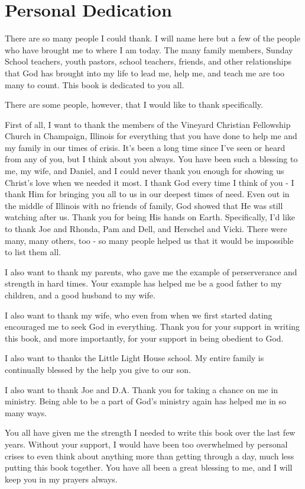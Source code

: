 \chapter{Personal Dedication}
\label{dedicationap}

There are so many people I could thank.  I will name here but a few
of the people who have brought me to where I am today.  The many family
members, Sunday School teachers, youth pastors, school teachers, friends,
and other relationships that God has brought into my life to lead me, help
me, and teach me are too many to count.  This book is dedicated to you all.

There are some people, however, that I would like to thank specifically.

First of all, I want to thank the members of the Vineyard Christian Fellowship 
Church in Champaign, Illinois for everything that you have done to help me and my 
family in our times of crisis.  It's been a long time since I've seen or 
heard from any of you, but I think about you always.  You have been
such a blessing to me, my wife, and Daniel, and I could never thank you
enough for showing us Christ's love when we needed it most.  I thank God
every time I think of you - I thank Him for bringing you all to us in
our deepest times of need.  Even out in the middle of Illinois with no
friends of family, God showed that He was still watching after us.  Thank
you for being His hands on Earth.  Specifically, I'd like to thank Joe and 
Rhonda, Pam and Dell, and Herschel and Vicki.  There were many, many others, 
too - so many people helped us that it would be impossible to list them all.

I also want to thank my parents, who gave me the example of perserverance and
strength in hard times.  Your example has helped me be a good father to my
children, and a good husband to my wife.

I also want to thank my wife, who even from when we first started dating encouraged
me to seek God in everything.  Thank you for your support in writing this book,
and more importantly, for your support in being obedient to God.

I also want to thanks the Little Light House school.  
My entire family is continually blessed by the help you give to our
son.

I also want to thank Joe and D.A.  Thank you for taking a chance on me
in ministry.  Being able to be a part of God's ministry again has helped me
in so many ways.

You all have given me the strength I needed to write this book over the last
few years.  Without your support, I would have been too overwhelmed by personal
crises to even think about anything more than getting through a day, much less
putting this book together.  You have all been a great
blessing to me, and I will keep you in my prayers always.

